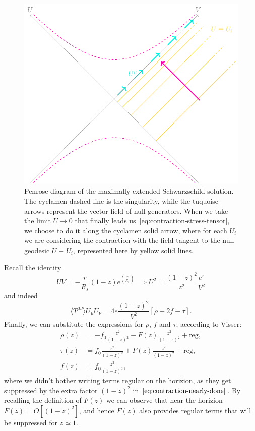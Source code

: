 \begin{figure}
    \centering
    \includegraphics[scale=1.1]{Immagini/Kruskal-extension/Kruskal-extension.pdf}
    \caption{Penrose diagram of the maximally extended Schwarzschild solution. The cyclamen dashed line is the singularity, while the tuquoise arrows represent the vector field of null generators. When we take the limit \(U\rightarrow 0\) that finally leads us~\eqref{eq:contraction-stress-tensor}, we choose to do it along the cyclamen solid arrow, where for each \(U_i\) we are considering the contraction with the field tangent to the null geodesic \(U \equiv U_i\), represented here by yellow solid lines.}
    \label{fig:Penrose-diagran-Kruskal-extension}
\end{figure}
Recall the identity
\[
UV = - \frac{r}{R_s} (1 - z) e^(\frac{r}{R_s}) \implies U^2 = \frac{(1 - z)^2}{z^2}  \frac{e^z}{V^2}
\]
and indeed
\begin{equation}
    \label{eq:contraction-nearly-done}
    \langle T^{\mu\nu}\rangle U_{\mu}U_{\nu} = 4e\frac{(1 - z)^2}{V^2}\left[\rho - 2f - \tau\right]. 
\end{equation}
Finally, we can substitute the expressions for \(\rho\), \(f\) and \(\tau\); according to Visser:
\begin{align*}
    \rho(z) &= -f_0 \frac{z^2}{(1 - z)^2} - F(z) \frac{z^2}{(1 - z)^2} + \text{reg}, \\
    \tau(z) &= f_0 \frac{z^2}{(1 - z)^2} + F(z) \frac{z^2}{(1 - z)^2} + \text{reg}, \\
    f(z) &= f_0 \frac{z^2}{(1 - z)^2},
\end{align*}
where we didn't bother writing terms regular on the horizion, as they get suppressed by the extra factor \((1 - z)^2\) in \(\eqref{eq:contraction-nearly-done}\). By recalling the definition of \(F(z)\) we can observe that near the horizion \(F(z) = O[(1 - z)^2]\), and hence \(F(z)\) also provides regular terms that will be suppressed for \(z \simeq 1\).

